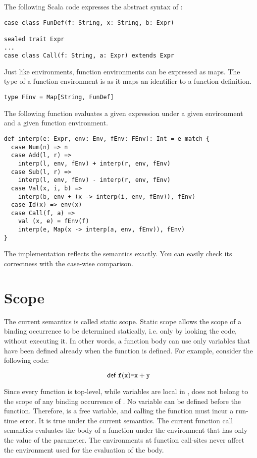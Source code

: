 The following Scala code expresses the abstract syntax of \lang:

\begin{verbatim}
case class FunDef(f: String, x: String, b: Expr)

sealed trait Expr
...
case class Call(f: String, a: Expr) extends Expr
\end{verbatim}

Just like environments, function environments can be expressed as maps.
The type of a function environment is  as it maps an
identifier to a function definition.

\begin{verbatim}
type FEnv = Map[String, FunDef]
\end{verbatim}

The following function evaluates a given expression under a given environment
and a given function environment.

\begin{verbatim}
def interp(e: Expr, env: Env, fEnv: FEnv): Int = e match {
  case Num(n) => n
  case Add(l, r) =>
    interp(l, env, fEnv) + interp(r, env, fEnv)
  case Sub(l, r) =>
    interp(l, env, fEnv) - interp(r, env, fEnv)
  case Val(x, i, b) =>
    interp(b, env + (x -> interp(i, env, fEnv)), fEnv)
  case Id(x) => env(x)
  case Call(f, a) =>
    val (x, e) = fEnv(f)
    interp(e, Map(x -> interp(a, env, fEnv)), fEnv)
}
\end{verbatim}

The implementation reflects the semantics exactly. You can easily check its
correctness with the case-wise comparison.

\section{Scope}

The current semantics is called static scope. Static scope allows the scope of a
binding occurrence to be determined statically, i.e. only by looking the code,
without executing it. In other words, a function body can use only variables
that have been defined already when the function is defined.
For example, consider the following code:

\[
  \textsf{def}\ \texttt{f}(\texttt{x})\texttt{=}\texttt{x}+\texttt{y}
\]

Since every function is top-level, while variables are local in \lang, 
does not belong to the scope of any binding occurrence of . No variable
can be defined before the function. Therefore,
 is a free variable, and calling the function  must incur a
run-time error. It is true under the current semantics. The current function
call semantics evaluates the body of a function under the environment that has
only the value of the parameter. The environments at function call-sites never
affect the environment used for the evaluation of the body.

